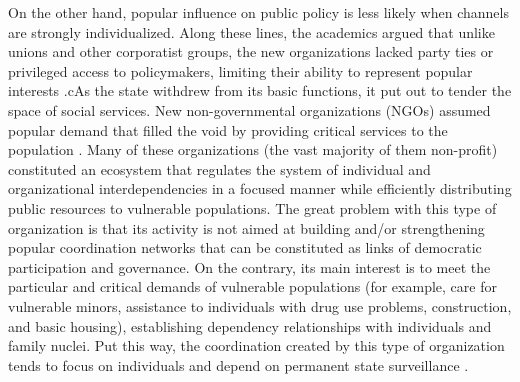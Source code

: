 On the other hand, popular influence on public policy is less likely when channels are strongly individualized. Along these lines, the academics argued that unlike unions and other corporatist groups, the new organizations lacked party ties or privileged access to policymakers, limiting their ability to represent popular interests \parencite{collier_reorganizing_2009, silva_reshaping_2018}.cAs the state withdrew from its basic functions, it put out to tender the space of social services. New non-governmental organizations (NGOs) assumed popular demand that filled the void by providing critical services to the population  \parencite{boulding_community_2020, holzner_poverty_2007}. Many of these organizations (the vast majority of them non-profit) constituted an ecosystem that regulates the system of individual and organizational interdependencies in a focused manner while efficiently distributing public resources to vulnerable populations. The great problem with this type of organization is that its activity is not aimed at building and/or strengthening popular coordination networks that can be constituted as links of democratic participation and governance. On the contrary, its main interest is to meet the particular and critical demands of vulnerable populations (for example, care for vulnerable minors, assistance to individuals with drug use problems, construction, and basic housing), establishing dependency relationships with individuals and family nuclei. Put this way, the coordination created by this type of organization tends to focus on individuals and depend on permanent state surveillance \parencite{delamaza_redes_2012}.
\bigskip

